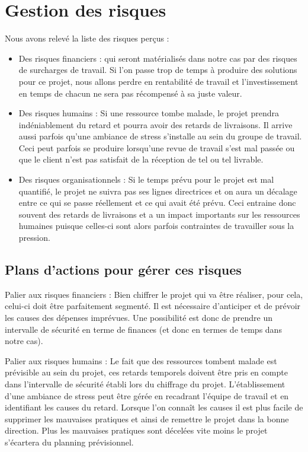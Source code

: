     \section{Gestion des risques}
Nous avons relevé la liste des risques perçus :
\begin{itemize}
\item Des risques financiers : qui seront matérialisés dans notre cas par des risques de surcharges de travail. Si l’on passe trop de temps à produire des solutions pour ce projet, nous allons perdre en rentabilité de travail et l’investissement en temps de chacun ne sera pas récompensé à sa juste valeur.
\item Des risques humains : Si une ressource tombe malade, le projet prendra indéniablement du retard et pourra avoir des retards de livraisons. Il arrive aussi parfois qu’une ambiance de stress s’installe au sein du groupe de travail. Ceci peut parfois se produire lorsqu’une revue de travail s’est mal passée ou que le client n’est pas satisfait de la réception de tel ou tel livrable.
\item Des risques organisationnels : Si le temps prévu pour le projet est mal quantifié, le projet ne suivra pas ses lignes directrices et on aura un décalage entre ce qui se passe réellement et ce qui avait été prévu. Ceci entraine donc souvent des retards de livraisons et a un impact importants sur les ressources humaines puisque celles-ci sont alors parfois contraintes de travailler sous la pression.
\end{itemize}

    \subsection{Plans d'actions pour gérer ces risques}
Palier aux risques financiers : Bien chiffrer le projet qui va être réaliser, pour cela, celui-ci doit être parfaitement segmenté. Il est nécessaire d’anticiper et de prévoir les causes des dépenses imprévues. Une possibilité est donc de prendre un intervalle de sécurité en terme de finances (et donc en termes de temps dans notre cas). 

Palier aux risques humains : Le fait que des ressources tombent malade est prévisible au sein du projet, ces retards temporels doivent être pris en compte dans l’intervalle de sécurité établi lors du chiffrage du projet. L’établissement d’une ambiance de stress peut être gérée en recadrant l’équipe de travail et en identifiant les causes du retard. Lorsque l’on connaît les causes il est plus facile de supprimer les mauvaises pratiques et ainsi de remettre le projet dans la bonne direction. Plus les mauvaises pratiques sont décelées vite moins le projet s’écartera du planning prévisionnel.   

